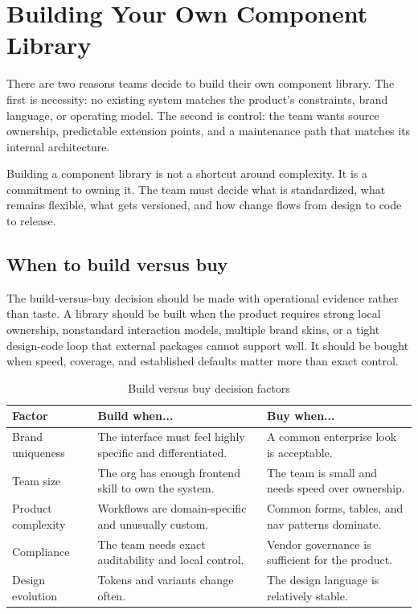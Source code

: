 \clearpage
\section{Building Your Own Component Library}

There are two reasons teams decide to build their own component library. The first is necessity: no existing system matches the product's constraints, brand language, or operating model. The second is control: the team wants source ownership, predictable extension points, and a maintenance path that matches its internal architecture.

Building a component library is not a shortcut around complexity. It is a commitment to owning it. The team must decide what is standardized, what remains flexible, what gets versioned, and how change flows from design to code to release.

\subsection{When to build versus buy}
The build-versus-buy decision should be made with operational evidence rather than taste. A library should be built when the product requires strong local ownership, nonstandard interaction models, multiple brand skins, or a tight design-code loop that external packages cannot support well. It should be bought when speed, coverage, and established defaults matter more than exact control.

\begin{table}[htbp]
  \centering
  \caption{Build versus buy decision factors}
  \begin{tabularx}{\textwidth}{@{}p{}p{}Y@{}}
    \toprule
    \textbf{Factor} & \textbf{Build when...} & \textbf{Buy when...} \\
    \midrule
    Brand uniqueness & The interface must feel highly specific and differentiated. & A common enterprise look is acceptable. \\
    Team size & The org has enough frontend skill to own the system. & The team is small and needs speed over ownership. \\
    Product complexity & Workflows are domain-specific and unusually custom. & Common forms, tables, and nav patterns dominate. \\
    Compliance & The team needs exact auditability and local control. & Vendor governance is sufficient for the product. \\
    Design evolution & Tokens and variants change often. & The design language is relatively stable. \\
    \bottomrule
  \end{tabularx}
\end{table}

